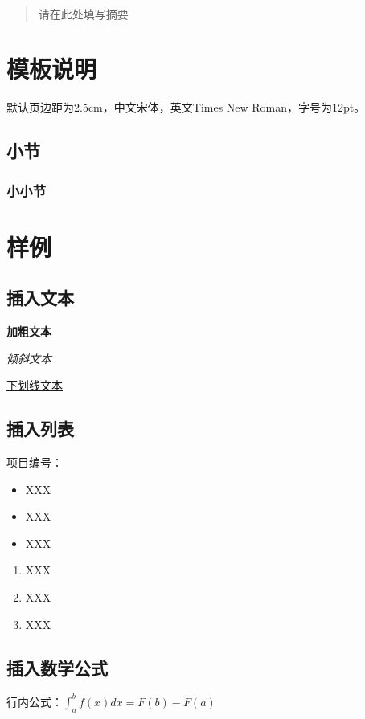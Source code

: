 \documentclass[12pt,hyperref,a4paper,UTF8]{ctexart}
\begin{document}
\cover\
\thispagestyle{empty}%

\begin{abstract}
    请在此处填写摘要
\end{abstract}


\newpage
\tableofcontents

\newpage

\section{模板说明}
默认页边距为2.5cm，中文宋体，英文Times New Roman，字号为12pt。
\subsection{小节}
\subsubsection{小小节}
\section{样例}
\subsection{插入文本}
\textbf{加粗文本}

\textit{倾斜文本}

\underline{下划线文本}

\subsection{插入列表}
项目编号：

\begin{itemize}
    \item XXX
    \item XXX
    \item XXX
\end{itemize}

\begin{enumerate}
    \item XXX
    \item XXX
    \item XXX
\end{enumerate}

\subsection{插入数学公式}
行内公式：$\int_a^b f(x)dx = F(b)-F(a)$
\end{document}
